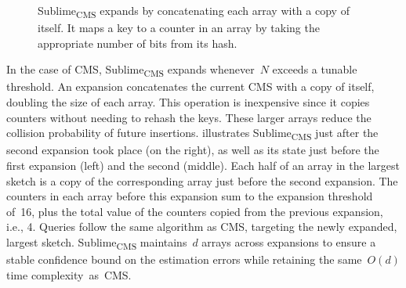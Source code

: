 \documentclass[sigconf]{acmart}
\newcommand{\sketch}{Sublime}
\newcommand{\sketchcms}{\sketch\textsubscript{CMS}\xspace}
\begin{document}
\begin{figure}
    \ifnotods
        \vspace{-1.42mm}
    \fi
    \caption{\sketchcms expands by concatenating each array with a copy of
    itself. It maps a key to a counter in an array by taking the appropriate
    number of bits from its hash.}
    \label{fig:sketch_chain}
\end{figure}

In the case of CMS, \sketchcms expands whenever~$N$ exceeds a tunable
threshold. An expansion concatenates the current CMS with a copy of itself,
doubling the size of each array. This operation is inexpensive since it copies
counters without needing to rehash the keys. These larger arrays reduce the
collision probability of future insertions. 
illustrates
\sketchcms just after the second expansion took place (on the right), as well
as its state just before the first expansion (left) and the second (middle).
Each half of an array in the largest sketch is a copy of the corresponding
array just before the second expansion. The counters in each array before this
expansion sum to the expansion threshold of~16, plus the total value of the
counters copied from the previous expansion, i.e., 4. Queries follow the same
algorithm as CMS, targeting the newly expanded, largest sketch. \sketchcms
maintains~$d$ arrays across expansions to ensure a stable confidence bound on
the estimation errors while retaining the same~$O(d)$ time complexity~as~CMS.
\end{document}
